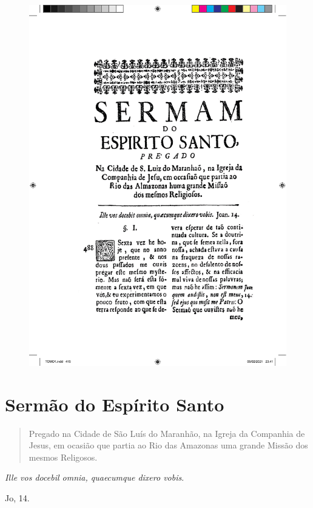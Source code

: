 \pagebreak
\thispagestyle{empty}
\movetoevenpage
\begin{figure}
\includegraphics[width=\textwidth]{./imgs/espirito.pdf}  
\end{figure}

\chapter{Sermão do Espírito Santo}

\begin{quotation}
\noindent{}Pregado na Cidade de São Luís do Maranhão, na Igreja da Companhia de Jesus,
em ocasião que partia ao Rio das Amazonas uma grande Missão dos mesmos Religosos.
\end{quotation}

\epigraph{\emph{Ille vos docebil omnia, quaecumque dixero vobis}.\footnotemark}{Jo, 14.}


